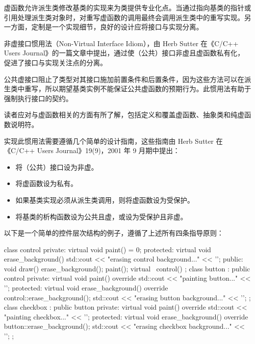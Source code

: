 
虚函数允许派生类修改基类的实现来为类提供专业化点。当通过指向基类的指针或引用处理派生类对象时，对重写虚函数的调用最终会调用派生类中的重写实现。另一方面，定制是一个实现细节，良好的设计应将接口与实现分离。

非虚接口惯用法（Non-Virtual Interface Idiom），由 Herb Sutter 在《C/C++ Users Journal》的一篇文章中提出，通过使（公共）接口非虚且虚函数私有化，促进了接口与实现关注点的分离。

公共虚接口阻止了类型对其接口施加前置条件和后置条件，因为这些方法可以在派生类中重写，所以期望基类实例不能保证公共虚函数的预期行为。此惯用法有助于强制执行接口的契约。


读者应对与虚函数相关的方面有所了解，包括定义和覆盖虚函数、抽象类和纯虚函数说明符。


实现此惯用法需要遵循几个简单的设计指南，这些指南由 Herb Sutter 在《C/C++ Users Journal》19(9)，2001 年 9 月期中提出：

\begin{itemize}
\item
将（公共）接口设为非虚。

\item
将虚函数设为私有。

\item
如果基类实现必须从派生类调用，则将虚函数设为受保护。

\item
将基类的析构函数设为公共且虚，或设为受保护且非虚。
\end{itemize}

以下是一个简单的控件层次结构的例子，遵循了上述所有四条指导原则：

\begin{cpp}
class control
{
private:
    virtual void paint() = 0;
protected:
    virtual void erase_background()
    {
        std::cout << "erasing control background..." << '\n';
    }
public:
    void draw()
    {
        erase_background();
        paint();
    }
    virtual ~control() {}
};
class button : public control
{
private:
    virtual void paint() override
    {
        std::cout << "painting button..." << '\n';
    }
protected:
    virtual void erase_background() override
    {
        control::erase_background();
        std::cout << "erasing button background..." << '\n';
    }
};
class checkbox : public button
{
private:
    virtual void paint() override
    {
        std::cout << "painting checkbox..." << '\n';
    }
protected:
    virtual void erase_background() override
    {
        button::erase_background();
        std::cout << "erasing checkbox background..." << '\n';
    }
};
\end{cpp}

